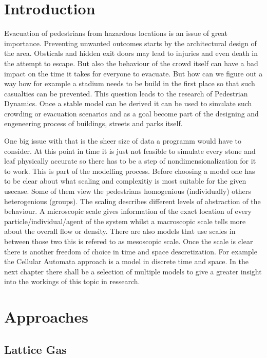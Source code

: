 

\section{Introduction}

Evacuation of pedestrians from hazardous locations is an issue of great importance. 
Preventing unwanted outcomes starts by the architectural design of the area.
Obsticals and hidden exit doors may lead to injuries and even death in the attempt to escape.
But also the behaviour of the crowd itself can have a bad impact on the time it takes for everyone to evacuate.
But how can we figure out a way how for example a stadium needs to be build in the first place so that such casualties can be prevented.
This question leads to the research of Pedestrian Dynamics. 
Once a stable model can be derived it can be used to simulate such crowding or evacuation scenarios and as a goal 
become part of the designing and engeneering process of buildings, streets and parks itself.

One big issue with that is the sheer size of data a programm would have to consider. 
At this point in time it is just not feasible to simulate every stone and leaf physically accurate
so there has to be a step of nondimensionalization for it to work. 
This is part of the modelling process. 
Before choosing a model one has to be clear about what scaling and complexitiy is most suitable for the given usecase.
Some of them view the pedestrians homogenious (individually) others heterogenious (groups).
The scaling describes different levels of abstraction of the behaviour.
A microscopic scale gives information of the exact location of every particle/individual/agent of the system 
whilst a macroscopic scale tells more about the overall flow or density. There are also models that use scales in between 
those two this is refered to as mesoscopic scale. 
Once the scale is clear there is another freedom of choice in time and space descretization. 
For example the Cellular Automata approach is a model in discrete time and space. 
In the next chapter there shall be a selection of multiple models to give a greater insight into the workings of this topic in ressearch.

\newpage
\section{Approaches}
\subsection{Lattice Gas}
